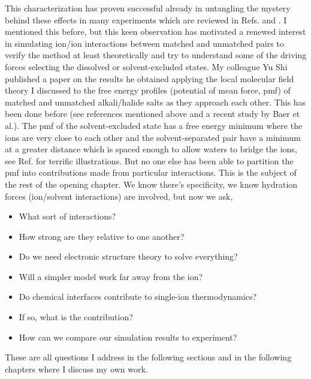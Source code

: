 \begin{intro}
    This characterization has proven successful already in untangling the mystery behind these effects in many experiments which are reviewed in Refs. \cite{collins2004ions} and
    \cite{collins2007review}. I mentioned this before, but this keen observation has motivated a renewed interest in simulating ion/ion interactions between matched and unmatched
    pairs to verify the method at least theoretically and try to understand some of the driving forces selecting the dissolved or solvent-excluded states. My colleague Yu Shi 
    published a paper on the results he obtained applying the local molecular field theory I discussed to the free energy profiles (potential of mean force, pmf) of matched and 
    unmatched alkali/halide salts as they approach each other\cite{shi2017lmwa}. This has been done before (see references mentioned above and a recent study by Baer et 
    al.\cite{baer2016local}). The pmf of the solvent-excluded state has a free energy minimum where the ions are very close to each other and the solvent-separated pair have a 
    minimum at a greater distance which is spaced enough to allow waters to bridge the ions, see Ref. \cite{fennell2009ion} for terrific illustrations. But no one else has been 
    able to partition the pmf into contributions made from particular interactions. This is the subject of the rest of the opening chapter. We know there's specificity, we know 
    hydration forces (ion/solvent interactions) are involved, but now we ask,
    
    \begin{itemize}
        \item What sort of interactions? 
        \item How strong are they relative to one another?
        \item Do we need electronic structure theory to solve everything?
        \item Will a simpler model work far away from the ion? 
        \item Do chemical interfaces contribute to single-ion thermodynamics? 
        \item If so, what is the contribution?
        \item How can we compare our simulation results to experiment?
    \end{itemize}
     
    These are all questions I address in the following sections and in the following chapters where I discuss my own work. 
     

\end{intro}
